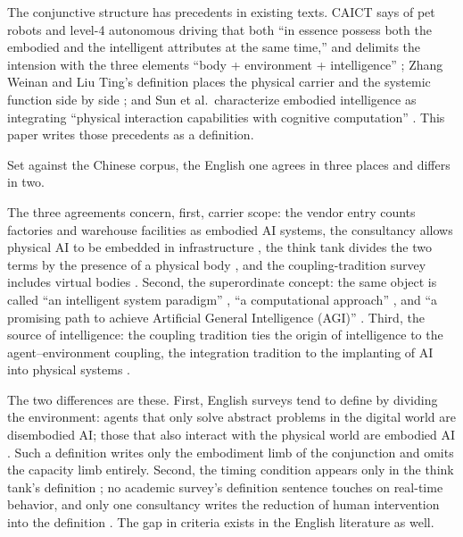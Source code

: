 \documentclass[10pt]{article}
\begin{document}
The conjunctive structure has precedents in existing texts. CAICT says of pet robots and level-4 autonomous driving that both ``in essence possess both the embodied and the intelligent attributes at the same time,'' and delimits the intension with the three elements ``body + environment + intelligence'' \cite{caict2024}; Zhang Weinan and Liu Ting's definition places the physical carrier and the systemic function side by side \cite{zhangwei2025}; and Sun et al.\ characterize embodied intelligence as integrating ``physical interaction capabilities with cognitive computation'' \cite{sun2024}. This paper writes those precedents as a definition.

Set against the Chinese corpus, the English one agrees in three places and differs in two.

The three agreements concern, first, carrier scope: the vendor entry counts factories and warehouse facilities as embodied AI systems, the consultancy allows physical AI to be embedded in infrastructure \cite{nvglossary,mckinsey2026}, the think tank divides the two terms by the presence of a physical body \cite{cset2026}, and the coupling-tradition survey includes virtual bodies \cite{liu2025csur}. Second, the superordinate concept: the same object is called ``an intelligent system paradigm'' \cite{feng2025}, ``a computational approach'' \cite{liu2025csur}, and ``a promising path to achieve Artificial General Intelligence (AGI)'' \cite{sun2024}. Third, the source of intelligence: the coupling tradition ties the origin of intelligence to the agent--environment coupling, the integration tradition to the implanting of AI into physical systems \cite{nvglossary}.

The two differences are these. First, English surveys tend to define by dividing the environment: agents that only solve abstract problems in the digital world are disembodied AI; those that also interact with the physical world are embodied AI \cite{feng2025,liu2024survey}. Such a definition writes only the embodiment limb of the conjunction and omits the capacity limb entirely. Second, the timing condition appears only in the think tank's definition \cite{cset2026}; no academic survey's definition sentence touches on real-time behavior, and only one consultancy writes the reduction of human intervention into the definition \cite{mckinsey2026}. The gap in criteria exists in the English literature as well.
\end{document}
